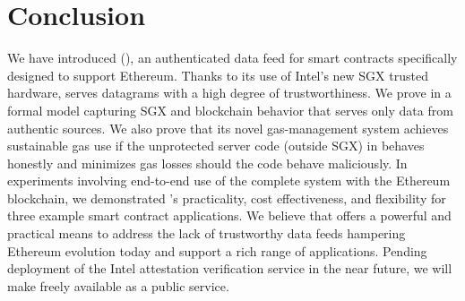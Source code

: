 \section{Conclusion}
\label{sec:conclude}

We have introduced \tcs (\tc), an authenticated data feed for smart contracts specifically designed to support Ethereum. 
Thanks to its use of Intel's new SGX trusted hardware, \tc serves datagrams with a high degree of trustworthiness. We prove in a formal model capturing SGX and blockchain behavior that \tc serves only data from authentic sources. We also prove that its novel gas-management system achieves sustainable gas use if the unprotected server code (outside SGX) in \tc behaves honestly and minimizes gas losses should the code behave maliciously. In experiments involving end-to-end use of the complete system with the Ethereum blockchain, we demonstrated \tc's practicality, cost effectiveness, and flexibility for three example  smart contract applications. We believe that \tc offers a powerful and practical means to address the lack of trustworthy data feeds hampering Ethereum evolution today and support a rich range of applications. Pending deployment of the Intel attestation verification service in the near future, we will make \tc freely available as a public service.
